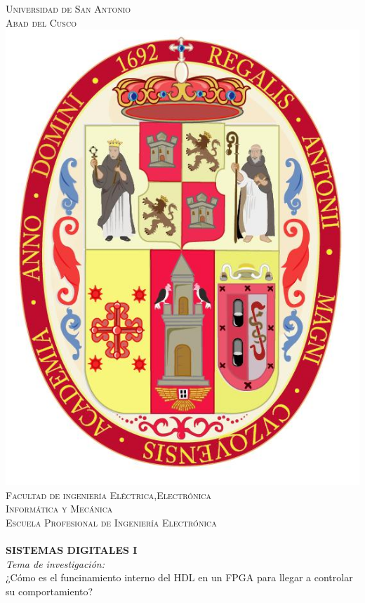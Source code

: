\begin{titlepage}
	\center
	\textsc{\LARGE Universidad de San Antonio \\[0.2cm] 
	Abad del Cusco}\\[1.5cm]
	\includegraphics[scale=0.3]{figures/escudo.jpg}\\[1cm]
	\textsc{\Large Facultad de ingeniería Eléctrica,Electrónica\\
	Informática y Mecánica}\\[0.4cm]
	\textsc{\large Escuela Profesional de Ingeniería 
	Electrónica}\\[0.4cm]
	\HRule \\[2mm]
	{\huge\bfseries {SISTEMAS DIGITALES I}}\vspace{-0.5mm}
	\HRule \\[4mm]
	\centering 
	\emph{\selectfont 
	Tema de investigación:} \\[2mm]
	{¿Cómo es el funcinamiento interno del HDL en un FPGA para 
	llegar a controlar su comportamiento?}\\[5mm]


\end{titlepage}
